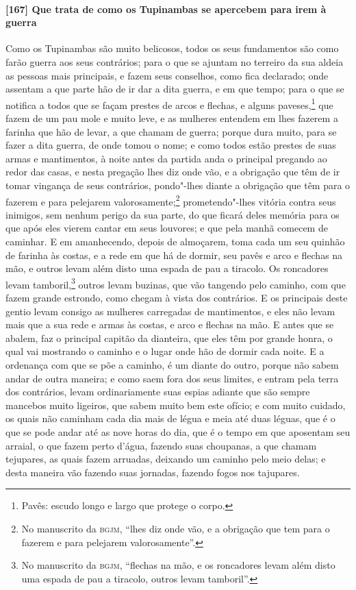 \begin{linenumbers}
\paragraph{[167] Que trata de como os Tupinambas se apercebem para irem à guerra}\quad
Como os Tupinambas são muito belicosos, todos os seus fundamentos são como farão guerra
aos seus contrários; para o que se ajuntam no terreiro da sua aldeia as pessoas mais
principais, e fazem seus conselhos, como fica declarado; onde assentam a que parte hão de
ir dar a dita guerra, e em que tempo; para o que se notifica a todos que se façam prestes
de arcos e flechas, e alguns paveses,\footnote{ Pavês: escudo longo e largo que protege o
corpo.} que fazem de um pau mole e muito leve, e as mulheres entendem em lhes fazerem a
farinha que hão de levar, a que chamam de guerra; porque dura muito, para se fazer a dita
guerra, de onde tomou o nome; e como todos estão prestes de suas armas e mantimentos, à
noite antes da partida anda o principal pregando ao redor das casas, e nesta pregação lhes
diz onde vão, e a obrigação que têm de ir tomar vingança de seus contrários, pondo"-lhes
diante a obrigação que têm para o fazerem e para pelejarem valorosamente;\footnote{ No
manuscrito da \textsc{bgjm}, ``lhes diz onde vão, e a obrigação que tem para o fazerem e
para pelejarem valorosamente''.} prometendo"-lhes vitória contra seus inimigos, sem nenhum
perigo da sua parte, do que ficará deles memória para os que após eles vierem cantar em
seus louvores; e que pela manhã comecem de caminhar. E em amanhecendo, depois de
almoçarem, toma cada um seu quinhão de farinha às costas, e a rede em que há de dormir,
seu pavês e arco e flechas na mão, e outros levam além disto uma espada de pau a tiracolo.
Os roncadores levam tamboril,\footnote{ No manuscrito da \textsc{bgjm}, ``flechas na mão,
e os roncadores levam além disto uma espada de pau a tiracolo, outros levam tamboril''.}
outros levam buzinas, que vão tangendo pelo caminho, com que fazem grande estrondo, como
chegam à vista dos contrários. E os principais deste gentio levam consigo as mulheres
carregadas de mantimentos, e eles não levam mais que a sua rede e armas às costas, e arco
e flechas na mão. E antes que se abalem, faz o principal capitão da dianteira, que eles
têm por grande honra, o qual vai mostrando o caminho e o lugar onde hão de dormir cada
noite. E a ordenança com que se põe a caminho, é um diante do outro, porque não sabem
andar de outra maneira; e como saem fora dos seus limites, e entram pela terra dos
contrários, levam ordinariamente suas espias adiante que são sempre mancebos muito
ligeiros, que sabem muito bem este ofício; e com muito cuidado, os quais não caminham cada
dia mais de légua e meia até duas léguas, que é o que se pode andar até as nove horas do
dia, que é o tempo em que aposentam seu arraial, o que fazem perto d'água, fazendo suas
choupanas, a que chamam tejupares, as quais fazem arruadas, deixando um caminho pelo meio
delas; e desta maneira vão fazendo suas jornadas, fazendo fogos nos tajupares.


\end{linenumbers}
